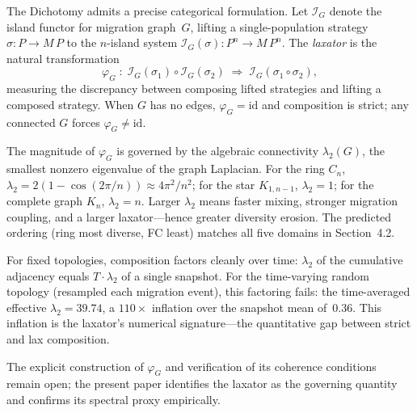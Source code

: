 \begin{remark}
\label{rem:laxator}
The Dichotomy admits a precise categorical formulation.
Let $\mathcal{I}_G$ denote the island functor for migration graph~$G$,
lifting a single-population strategy $\sigma : P \to M\,P$ to the
$n$-island system $\mathcal{I}_G(\sigma) : P^n \to M\,P^n$.
The \emph{laxator} is the natural transformation
\[
  \varphi_G \;:\;
  \mathcal{I}_G(\sigma_1) \circ \mathcal{I}_G(\sigma_2)
  \;\Longrightarrow\;
  \mathcal{I}_G(\sigma_1 \circ \sigma_2),
\]
measuring the discrepancy between composing lifted strategies and
lifting a composed strategy.  When $G$ has no edges,
$\varphi_G = \mathrm{id}$ and composition is strict; any connected
$G$ forces $\varphi_G \neq \mathrm{id}$.

The magnitude of $\varphi_G$ is governed by the algebraic
connectivity $\lambda_2(G)$, the smallest nonzero eigenvalue of the
graph Laplacian.  For the ring $C_n$,
$\lambda_2 = 2(1 - \cos(2\pi/n)) \approx 4\pi^2/n^2$; for the star
$K_{1,n-1}$, $\lambda_2 = 1$; for the complete graph $K_n$,
$\lambda_2 = n$.  Larger $\lambda_2$ means faster mixing, stronger
migration coupling, and a larger laxator---hence greater diversity
erosion.  The predicted ordering (ring most diverse, FC least) matches
all five domains in Section~4.2.

For fixed topologies, composition factors cleanly over time:
$\lambda_2$ of the cumulative adjacency equals $T \cdot \lambda_2$
of a single snapshot.  For the time-varying random topology
(resampled each migration event), this factoring fails: the
time-averaged effective $\lambda_2 = 39.74$, a $110\times$ inflation
over the snapshot mean of~$0.36$.  This inflation is the laxator's
numerical signature---the quantitative gap between strict and lax
composition.

The explicit construction of $\varphi_G$ and verification of its
coherence conditions remain open; the present paper identifies the
laxator as the governing quantity and confirms its spectral proxy
empirically.
\end{remark}
